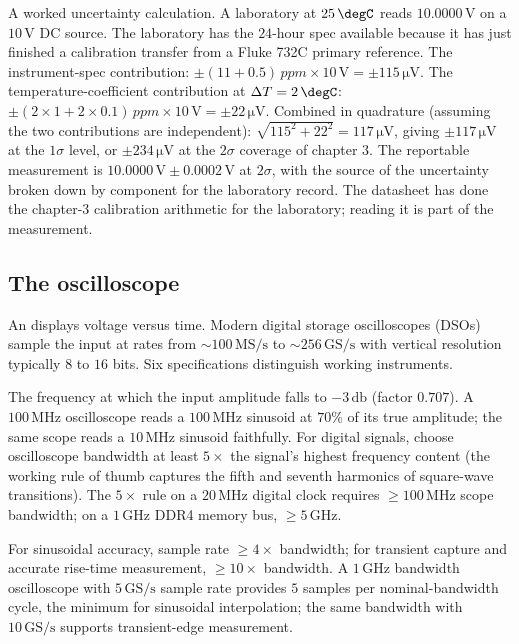 A worked uncertainty calculation. A laboratory at $25 \,\degC$ reads
$10.0000 \,\si{\volt}$ on a $10 \,\si{\volt}$ DC source. The
laboratory has the $24$-hour spec available because it has just
finished a calibration transfer from a Fluke 732C primary
reference. The instrument-spec contribution:
$\pm (11 + 0.5) \,\si{ppm} \times 10 \,\si{\volt}
= \pm 115 \,\si{\micro\volt}$.
The temperature-coefficient contribution at $\Delta T = 2 \,\degC$:
$\pm (2 \times 1 + 2 \times 0.1) \,\si{ppm} \times 10 \,\si{\volt}
= \pm 22 \,\si{\micro\volt}$.
Combined in quadrature (assuming the two contributions are
independent): $\sqrt{115^{2} + 22^{2}} = 117 \,\si{\micro\volt}$,
giving $\pm 117 \,\si{\micro\volt}$ at the $1\sigma$ level, or
$\pm 234 \,\si{\micro\volt}$ at the $2\sigma$ coverage of
chapter 3. The reportable measurement is
$10.0000 \,\si{\volt} \pm 0.0002 \,\si{\volt}$ at $2\sigma$, with
the source of the uncertainty broken down by component for the
laboratory record. The datasheet has done the chapter-3 calibration
arithmetic for the laboratory; reading it is part of the
measurement.

\subsection{The oscilloscope}

An  displays voltage versus time. Modern
digital storage oscilloscopes (DSOs) sample the input at rates
from $\sim 100\,\text{MS/s}$ to $\sim 256\,\text{GS/s}$ with
vertical resolution typically $8$ to $16$ bits. Six specifications
distinguish working instruments.

 The frequency at which the input amplitude
falls to $-3\,\si{\decibel}$ (factor $0.707$). A $100\,\si{\mega
\hertz}$ oscilloscope reads a $100\,\si{\mega\hertz}$ sinusoid at
$70\%$ of its true amplitude; the same scope reads a $10\,\si{
\mega\hertz}$ sinusoid faithfully. For digital signals, choose
oscilloscope bandwidth at least $5\times$ the signal's highest
frequency content (the working rule of thumb captures the fifth
and seventh harmonics of square-wave transitions). The
$5\times$ rule on a $20\,\si{\mega\hertz}$ digital clock requires
$\geq 100\,\si{\mega\hertz}$ scope bandwidth; on a $1\,\si{\giga
\hertz}$ DDR4 memory bus, $\geq 5\,\si{\giga\hertz}$.

 For sinusoidal accuracy, sample rate
$\geq 4\times$ bandwidth; for transient capture and accurate
rise-time measurement, $\geq 10\times$ bandwidth. A $1\,\si{
\giga\hertz}$ bandwidth oscilloscope with $5\,\text{GS/s}$
sample rate provides $5$ samples per nominal-bandwidth cycle, the
minimum for sinusoidal interpolation; the same bandwidth with
$10\,\text{GS/s}$ supports transient-edge measurement.

